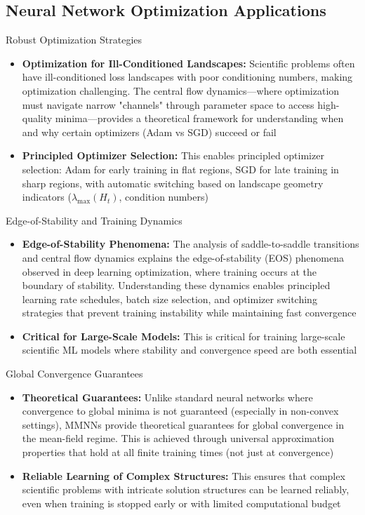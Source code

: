 \documentclass[aspectratio=169]{beamer}
\begin{document}
\subsection{Neural Network Optimization Applications}

\begin{frame}{Robust Optimization Strategies}
\begin{itemize}
\item \textbf{Optimization for Ill-Conditioned Landscapes:} Scientific problems often have ill-conditioned loss landscapes with poor conditioning numbers, making optimization challenging. The central flow dynamics—where optimization must navigate narrow "channels" through parameter space to access high-quality minima—provides a theoretical framework for understanding when and why certain optimizers (Adam vs SGD) succeed or fail
\item \textbf{Principled Optimizer Selection:} This enables principled optimizer selection: Adam for early training in flat regions, SGD for late training in sharp regions, with automatic switching based on landscape geometry indicators ($\lambda_{\max}(H_t)$, condition numbers)
\end{itemize}
\end{frame}

\begin{frame}{Edge-of-Stability and Training Dynamics}
\begin{itemize}
\item \textbf{Edge-of-Stability Phenomena:} The analysis of saddle-to-saddle transitions and central flow dynamics explains the edge-of-stability (EOS) phenomena observed in deep learning optimization, where training occurs at the boundary of stability. Understanding these dynamics enables principled learning rate schedules, batch size selection, and optimizer switching strategies that prevent training instability while maintaining fast convergence
\item \textbf{Critical for Large-Scale Models:} This is critical for training large-scale scientific ML models where stability and convergence speed are both essential
\end{itemize}
\end{frame}

\begin{frame}{Global Convergence Guarantees}
\begin{itemize}
\item \textbf{Theoretical Guarantees:} Unlike standard neural networks where convergence to global minima is not guaranteed (especially in non-convex settings), MMNNs provide theoretical guarantees for global convergence in the mean-field regime. This is achieved through universal approximation properties that hold at all finite training times (not just at convergence)
\item \textbf{Reliable Learning of Complex Structures:} This ensures that complex scientific problems with intricate solution structures can be learned reliably, even when training is stopped early or with limited computational budget
\end{itemize}
\end{frame}
\end{document}
